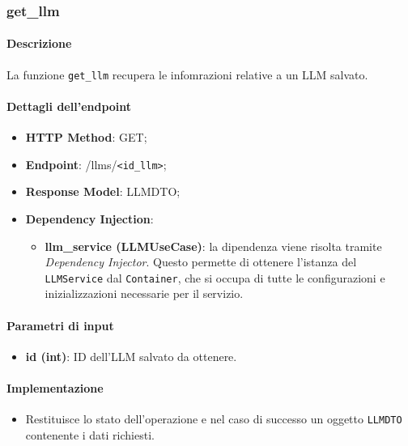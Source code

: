 \subsubsection{get\_llm}
\label{sec:get_llm}

\paragraph{Descrizione}
La funzione \texttt{get\_llm} recupera le infomrazioni relative a un LLM salvato.

\paragraph{Dettagli dell'endpoint}
\begin{itemize}
    \item \textbf{HTTP Method}: GET;
    \item \textbf{Endpoint}: /llms/\texttt{<id\_llm>};
    \item \textbf{Response Model}: LLMDTO;
    \item \textbf{Dependency Injection}:
    \begin{itemize}
        \item \textbf{llm\_service (LLMUseCase)}: la dipendenza viene risolta tramite \textit{Dependency Injector}. Questo permette di ottenere l'istanza del \texttt{LLMService} dal \texttt{Container}, che si occupa di tutte le configurazioni e inizializzazioni necessarie per il servizio.
    \end{itemize}
\end{itemize}

\paragraph{Parametri di input}
\begin{itemize}
    \item \textbf{id (int)}: ID dell'LLM salvato da ottenere.
\end{itemize}

\paragraph{Implementazione}
\begin{itemize}
    \item Restituisce lo stato dell'operazione e nel caso di successo un oggetto \texttt{LLMDTO} contenente i dati richiesti.
\end{itemize}


